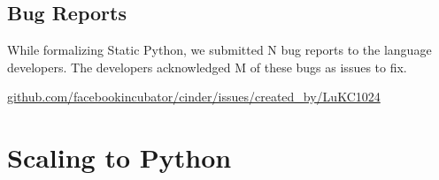 \documentclass[english,cleveref,submission]{programming}
\newcommand{\shorturl}[2]{\href{#1#2}{#2}}
\begin{document}


\subsection{Bug Reports}

While formalizing Static Python, we submitted N bug reports to the language developers.
The developers acknowledged M of these bugs as issues to fix.

\begin{center}
  \shorturl{https://}{github.com/facebookincubator/cinder/issues/created\_by/LuKC1024}
\end{center}


\section{Scaling to Python}
\label{s:impl}





\end{document}
